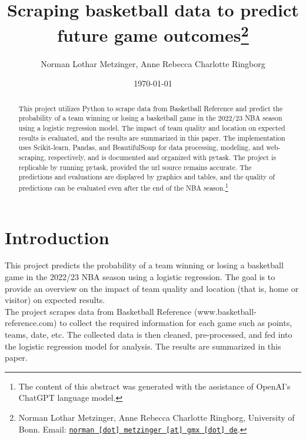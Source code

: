 \documentclass[11pt, a4paper, leqno]{article}
\begin{document}
\title{Scraping basketball data to predict future game outcomes\thanks{Norman Lothar Metzinger, Anne Rebecca Charlotte Ringborg, University of Bonn. Email: \href{mailto:norman.metzinger@gmx.de}{\nolinkurl{norman [dot] metzinger [at] gmx [dot] de}}.}}

\author{Norman Lothar Metzinger, Anne Rebecca Charlotte Ringborg}

\date{
    \today
}

\maketitle


\begin{abstract}
    This project utilizes Python to scrape data from Basketball Reference and predict the probability of a team winning or losing a basketball game in the 2022/23 NBA season using a logistic regression model.
    The impact of team quality and location on expected results is evaluated, and the results are summarized in this paper.
    The implementation uses Scikit-learn, Pandas, and BeautifulSoup for data processing, modeling, and web-scraping, respectively, and is documented and organized with pytask.
    The project is replicable by running pytask, provided the url source remains accurate.
    The predictions and evaluations are displayed by graphics and tables, and the quality of predictions can be evaluated even after the end of the NBA season.\footnote{The content of this abstract was generated with the assistance of OpenAI's ChatGPT language model.}
\end{abstract}

\clearpage


\section{Introduction} %
\label{sec:introduction}

This project predicts the probability of a team winning or losing a basketball game in the 2022/23 NBA season using a logistic regression. The goal is to provide an overview on the impact of team quality and location (that is, home or visitor) on expected results.\\

The project scrapes data from Basketball Reference (www.basketball-reference.com) to collect the required information for each game such as points, teams, date, etc.
The collected data is then cleaned, pre-processed, and fed into the logistic regression model for analysis. The results are summarized in this paper.\\
\end{document}
